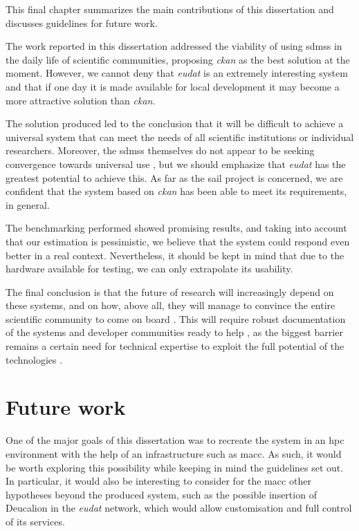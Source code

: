 \label{ref:chapter_5}

This final chapter summarizes the main contributions of this dissertation and discusses guidelines for future work.

The work reported in this dissertation addressed the viability of using \gls{sdms}s in the daily life of scientific communities, proposing \textit{\gls{ckan}} as the best solution at the moment. However, we cannot deny that  \textit{\gls{eudat}} is an extremely interesting system and that if one day it is made available for local development it may become a more attractive solution than  \textit{\gls{ckan}}.

The solution produced led to the conclusion that it will be difficult to achieve a universal system that can meet the needs of all scientific institutions or individual researchers. Moreover, the \gls{sdms}s themselves do not appear to be seeking convergence towards universal use \citep{assante}, but we should emphasize that \textit{\gls{eudat}} has the greatest potential to achieve this. As far as the \gls{sail} project is concerned, we are confident that the system based on  \textit{\gls{ckan}} has been able to meet its requirements, in general.

The benchmarking performed showed promising results, and taking into account that our estimation is pessimistic, we believe that the system could respond even better in a real context. Nevertheless, it should be kept in mind that due to the hardware available for testing, we can only extrapolate its usability.

The final conclusion is that the future of research will increasingly depend on these systems, and on how, above all, they will manage to convince the entire scientific community to come on board \citep{poschen}. This will require robust documentation of the systems and developer communities ready to help \citep{vardigan}, as the biggest barrier remains a certain need for technical expertise to exploit the full potential of the technologies \citep{9}.

\section{Future work}

One of the major goals of this dissertation was to recreate the system in an \gls{hpc} environment with the help of an infrastructure such as \gls{macc}. As such, it would be worth exploring this possibility while keeping in mind the guidelines set out. In particular, it would also be interesting to consider for the \gls{macc} other hypotheses beyond the produced system, such as the possible insertion of Deucalion in the  \textit{\gls{eudat}} network,  which would allow customisation and full control of its services.

